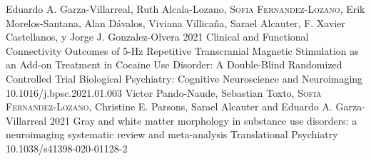 {
\setlength\tabcolsep{0pt} \setlength{\extrarowheight}{0pt}%
\begin{itemize}[leftmargin=5ex, nosep, noitemsep, itemindent=-13pt,
    label=\raisebox{0.25ex}{\tiny$\bullet$}]%
    \vspace{-1.8mm}%
    \cvarticle
    {Eduardo A. Garza-Villarreal, Ruth Alcala-Lozano,
      {\scshape{Sofia Fernandez-Lozano}}, Erik Morelos-Santana,
      Alan Dávalos, Viviana Villicaña, Sarael Alcauter,
      F. Xavier Castellanos, y Jorge J. Gonzalez-Olvera}
    {2021}
    {Clinical and Functional Connectivity Outcomes of 5-Hz Repetitive Transcranial Magnetic Stimulation as an Add-on Treatment in Cocaine Use Disorder: A Double-Blind Randomized Controlled Trial}
    {Biological Psychiatry: Cognitive Neuroscience and Neuroimaging}
    {10.1016/j.bpsc.2021.01.003}
    \cvarticle
    {Victor Pando-Naude, Sebastian Toxto, {\scshape{Sofia Fernandez-Lozano}},
      Christine E. Parsons, Sarael Alcauter and Eduardo A. Garza-Villarreal}
    {2021}
    {Gray and white matter morphology in substance use disorders: a neuroimaging systematic review and meta-analysis}
    {Translational Psychiatry}
    {10.1038/s41398-020-01128-2}
\end{itemize}
}
